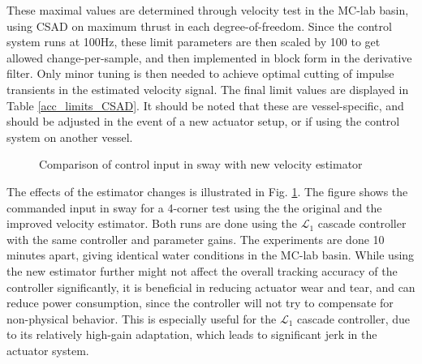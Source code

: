These maximal values are determined through velocity test in the MC-lab basin, using CSAD on maximum thrust in each degree-of-freedom. Since the control system runs at 100Hz, these limit parameters are then scaled by 100 to get allowed change-per-sample, and then implemented in block form in the derivative filter. Only minor tuning is then needed to achieve optimal cutting of impulse transients in the estimated velocity signal. The final limit values are displayed in Table \ref{acc_limits_CSAD}. It should be noted that these are vessel-specific, and should be adjusted in the event of a new actuator setup, or if using the control system on another vessel. 

\begin{figure}[!h]
    \centering
    \caption{ Comparison of control input in sway with new velocity estimator}\label{fig:est_comparison}
\end{figure}

The effects of the estimator changes is illustrated in Fig. \ref{fig:est_comparison}. The figure shows the commanded input in sway for a 4-corner test using the the original and the improved velocity estimator. Both runs are done using the $\mathcal{L}_1$ cascade controller with the same controller and parameter gains. The experiments are done 10 minutes apart, giving identical water conditions in the MC-lab basin. While using the new estimator further might not affect the overall tracking accuracy of the controller significantly, it is beneficial in reducing actuator wear and tear, and can reduce power consumption, since the controller will not try to compensate for non-physical behavior. This is especially useful for the $\mathcal{L}_1$ cascade controller, due to its relatively high-gain adaptation, which leads to significant jerk in the actuator system. 

